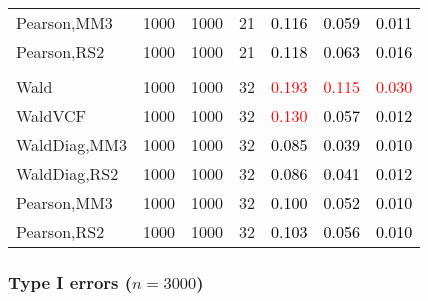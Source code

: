 \documentclass[
]{article}
\begin{document}
\begin{table}[H]
{\begin{tabular}[t]{lrrrrrr}
\hspace{1em}Pearson,MM3 & 1000 & 1000 & 21 & \textcolor{black}{0.116} & \textcolor{black}{0.059} & \textcolor{black}{0.011}\\
\hspace{1em}Pearson,RS2 & 1000 & 1000 & 21 & \textcolor{black}{0.118} & \textcolor{black}{0.063} & \textcolor{black}{0.016}\\
\addlinespace[0.3em]
\multicolumn{7}{l}{\textbf{3F 15V}}\\
\hspace{1em}Wald & 1000 & 1000 & 32 & \textcolor{red}{0.193} & \textcolor{red}{0.115} & \textcolor{red}{0.030}\\
\hspace{1em}WaldVCF & 1000 & 1000 & 32 & \textcolor{red}{0.130} & \textcolor{black}{0.057} & \textcolor{black}{0.012}\\
\hspace{1em}WaldDiag,MM3 & 1000 & 1000 & 32 & \textcolor{black}{0.085} & \textcolor{black}{0.039} & \textcolor{black}{0.010}\\
\hspace{1em}WaldDiag,RS2 & 1000 & 1000 & 32 & \textcolor{black}{0.086} & \textcolor{black}{0.041} & \textcolor{black}{0.012}\\
\hspace{1em}Pearson,MM3 & 1000 & 1000 & 32 & \textcolor{black}{0.100} & \textcolor{black}{0.052} & \textcolor{black}{0.010}\\
\hspace{1em}Pearson,RS2 & 1000 & 1000 & 32 & \textcolor{black}{0.103} & \textcolor{black}{0.056} & \textcolor{black}{0.010}\\
\bottomrule
\end{tabular}}
\endgroup{}
\end{table}

\hypertarget{type-i-errors-n3000-2}{%
\subsubsection{\texorpdfstring{Type I errors
(\(n=3000\))}{Type I errors (n=3000)}}\label{type-i-errors-n3000-2}}
\end{document}
